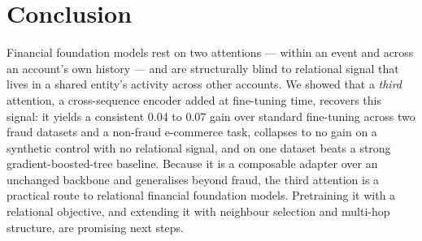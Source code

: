 \section{Conclusion}
\label{sec:conclusion}

Financial foundation models rest on two attentions --- within an event and across an account's own
history --- and are structurally blind to relational signal that lives in a shared entity's activity
across other accounts. We showed that a \emph{third} attention, a cross-sequence encoder added at
fine-tuning time, recovers this signal: it yields a consistent \num{+0.04} to \num{+0.07} \prauc{}
gain over standard fine-tuning across two fraud datasets and a non-fraud e-commerce task, collapses
to no gain on a synthetic control with no relational signal, and on one dataset beats a strong
gradient-boosted-tree baseline. Because it is a composable adapter over an unchanged backbone and
generalises beyond fraud, the third attention is a practical route to relational financial foundation
models. Pretraining it with a relational objective, and extending it with neighbour selection and
multi-hop structure, are promising next steps.
